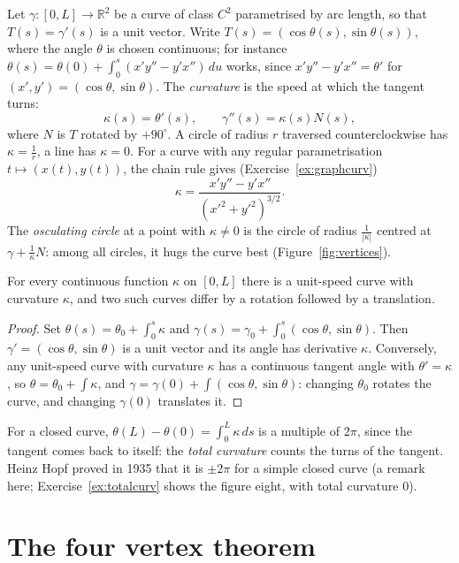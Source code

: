 Let $\gamma:[0,L]\to\mathbb R^2$ be a curve of class $C^2$ parametrised by arc length, so that $T(s)=\gamma'(s)$ is a unit vector. Write
$T(s)=(\cos\theta(s),\sin\theta(s))$, where the angle $\theta$ is chosen continuous; for instance $\theta(s)=\theta(0)+\int_0^s(x'y''-y'x'')\,du$ works, since
$x'y''-y'x''=\theta'$ for $(x',y')=(\cos\theta,\sin\theta)$. The \emph{curvature} is the speed at which the tangent turns:
\[
\kappa(s)=\theta'(s),\qquad\gamma''(s)=\kappa(s)N(s),
\]
where $N$ is $T$ rotated by $+90^\circ$. A circle of radius $r$ traversed counterclockwise has $\kappa=\frac1r$, a line has $\kappa=0$. For a curve with any regular
parametrisation $t\mapsto(x(t),y(t))$, the chain rule gives (Exercise~\ref{ex:graphcurv})
\[
\kappa=\frac{x'y''-y'x''}{(x'^2+y'^2)^{3/2}}.
\]
The \emph{osculating circle} at a point with $\kappa\ne0$ is the circle of radius $\frac1{|\kappa|}$ centred at $\gamma+\frac1\kappa N$: among all circles, it hugs the curve
best (Figure~\ref{fig:vertices}).

\begin{theorem}\label{thm:fundcurve}
For every continuous function $\kappa$ on $[0,L]$ there is a unit-speed curve with curvature $\kappa$, and two such curves differ by a rotation followed by a
translation.
\end{theorem}

\begin{proof}
Set $\theta(s)=\theta_0+\int_0^s\kappa$ and $\gamma(s)=\gamma_0+\int_0^s(\cos\theta,\sin\theta)$. Then $\gamma'=(\cos\theta,\sin\theta)$ is a unit vector and its angle
has derivative $\kappa$. Conversely, any unit-speed curve with curvature $\kappa$ has a continuous tangent angle with $\theta'=\kappa$, so $\theta=\theta_0+\int\kappa$, and
$\gamma=\gamma(0)+\int(\cos\theta,\sin\theta)$: changing $\theta_0$ rotates the curve, and changing $\gamma(0)$ translates it.
\end{proof}

For a closed curve, $\theta(L)-\theta(0)=\int_0^L\kappa\,ds$ is a multiple of $2\pi$, since the tangent comes back to itself: the \emph{total curvature} counts the
turns of the tangent. Heinz Hopf proved in 1935 that it is $\pm2\pi$ for a simple closed curve (a remark here; Exercise~\ref{ex:totalcurv} shows the figure eight,
with total curvature $0$).

\section{The four vertex theorem}

